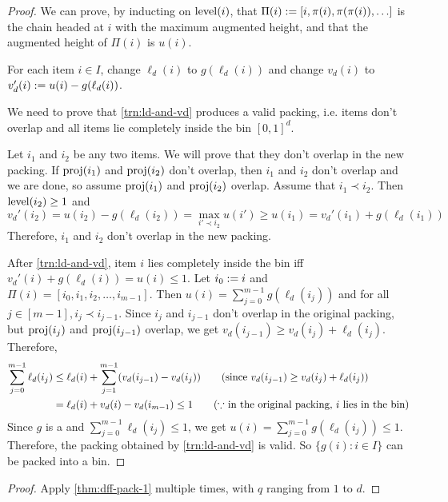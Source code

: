 \begin{proof}
We can prove, by inducting on $\operatorname{level}(i)$, that
$\Pi(i) := [i, \pi(i), \pi(\pi(i)), \ldots]$ is the chain headed at $i$ with
the maximum augmented height, and that the augmented height of $\Pi(i)$ is $u(i)$.

\begin{transformation}
\label{trn:ld-and-vd}
For each item $i \in I$, change $\ell_d(i)$ to $g(\ell_d(i))$
and change $v_d(i)$ to $v_d'(i) := u(i) - g(\ell_d(i))$.
\end{transformation}

We need to prove that \cref{trn:ld-and-vd} produces a valid packing,
i.e. items don't overlap and all items lie completely inside the bin $[0, 1]^d$.

Let $i_1$ and $i_2$ be any two items. We will prove that they don't overlap in the new packing.
If $\operatorname{proj}(i_1)$ and $\operatorname{proj}(i_2)$ don't overlap, then $i_1$ and $i_2$ don't overlap
and we are done, so assume $\operatorname{proj}(i_1)$ and $\operatorname{proj}(i_2)$ overlap.
Assume \wLoG{} that $i_1 \prec i_2$. Then $\operatorname{level}(i_2) \ge 1$ and
\[ v_d'(i_2) = u(i_2) - g(\ell_d(i_2)) = \max_{i' \prec i_2} u(i')
\ge u(i_1) = v_d'(i_1) + g(\ell_d(i_1)) \]
Therefore, $i_1$ and $i_2$ don't overlap in the new packing.

After \cref{trn:ld-and-vd}, item $i$ lies completely inside the bin
iff $v_d'(i) + g(\ell_d(i)) = u(i) \le 1$. Let $i_0 := i$ and
$\Pi(i) = [i_0, i_1, i_2, \ldots, i_{m-1}]$.
Then $u(i) = \sum_{j=0}^{m-1} g(\ell_d(i_j))$ and for all $j \in [m-1], i_j \prec i_{j-1}$.
Since $i_j$ and $i_{j-1}$ don't overlap in the original packing,
but $\operatorname{proj}(i_j)$ and $\operatorname{proj}(i_{j-1})$ overlap,
we get $v_d(i_{j-1}) \ge v_d(i_j) + \ell_d(i_j)$. Therefore,
\begin{align*}
\sum_{j=0}^{m-1} \ell_d(i_j)
&\le \ell_d(i) + \sum_{j=1}^{m-1} (v_d(i_{j-1}) - v_d(i_j))
\tag{since $v_d(i_{j-1}) \ge v_d(i_j) + \ell_d(i_j)$}
\\ &= \ell_d(i) + v_d(i) - v_d(i_{m-1})
\le 1
\tag{$\because$ in the original packing, $i$ lies in the bin}
\end{align*}
Since $g$ is a \dff{} and $\sum_{j=0}^{m-1} \ell_d(i_j) \le 1$,
we get $u(i) = \sum_{j=0}^{m-1} g(\ell_d(i_j)) \le 1$.
Therefore, the packing obtained by \cref{trn:ld-and-vd} is valid.
So $\{g(i): i \in I\}$ can be packed into a bin.
\end{proof}

\rthmDffPack*
\begin{proof}[Proof]
Apply \cref{thm:dff-pack-1} multiple times, with $q$ ranging from $1$ to $d$.
\end{proof}
